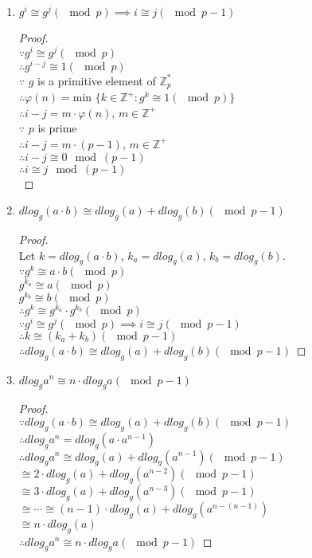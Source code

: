 \documentclass[paper=a4, fontsize=11pt]{scrartcl} %
\numberwithin{equation}{section} %
\numberwithin{figure}{section} %
\newcommand{\pnl}{$ $\newline\\}
\newcommand{\Z}{\mathbb{Z}}
\begin{document}
\begin{enumerate}
\item $g^i \cong g^j (\mod p) \implies i \cong j (\mod p - 1)$
\begin{proof}
\pnl
$\because g^i \cong g^j (\mod p)$\\
$\therefore g^{i-j} \cong 1 (\mod p)$\\
$\because$ $g$ is a primitive element of $\Z_p^*$\\
$\therefore \varphi(n) = $min $\{k \in \Z^+ :g^k \cong 1 (\mod p)\}$\\
$\therefore i-j = m\cdot \varphi(n)$, $m \in \Z^+$\\
$\because$ $p$ is prime\\
$\therefore i-j = m\cdot (p-1)$, $m \in \Z^+$\\
$\therefore i-j \cong 0 \mod (p-1)$\\
$\therefore i \cong j \mod (p-1)$\\
\end{proof}
\item $dlog_g(a\cdot b) \cong dlog_g(a)+dlog_g(b) (\mod p-1)$

\begin{proof}
\pnl
Let $k = dlog_g(a\cdot b)$, $k_a = dlog_g(a)$, $k_b = dlog_g(b)$.\\
$\because g^k \cong a\cdot b (\mod p)$\\
$g^{k_a} \cong a (\mod p)$\\
$g^{k_b} \cong b (\mod p)$\\
$\therefore g^k \cong g^{k_a} \cdot g^{k_b} (\mod p)$\\
$\because g^i \cong g^j (\mod p) \implies i \cong j (\mod p - 1)$\\
$\therefore k \cong (k_a + k_b) (\mod p-1)$\\
$\therefore dlog_g(a\cdot b) \cong dlog_g(a)+dlog_g(b) (\mod p-1)$

\end{proof}
\item $dlog_ga^n \cong n\cdot dlog_ga(\mod p-1)$

\begin{proof}
\pnl
$\because dlog_g(a\cdot b) \cong dlog_g(a)+dlog_g(b) (\mod p-1)$\\
$\therefore dlog_ga^n = dlog_g(a\cdot a^{n-1})$\\
$\therefore dlog_ga^n \cong dlog_g(a)+dlog_g(a^{n-1}) (\mod p-1)$\\
$\cong 2 \cdot dlog_g(a)+dlog_g(a^{n-2}) (\mod p-1)$\\
$\cong 3 \cdot dlog_g(a)+dlog_g(a^{n-3}) (\mod p-1)$\\
$\cong \cdots \cong (n-1) \cdot dlog_g(a) + dlog_g(a^{n-(n-1)})$\\
$\cong n \cdot dlog_g(a)$\\
$\therefore dlog_ga^n \cong n\cdot dlog_ga(\mod p-1)$
\end{proof}
\end{enumerate}
\end{document}

